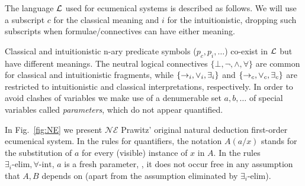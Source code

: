 
The language ${\mathcal L}$ used for ecumenical systems is described as follows. We will use a subscript $c$ for the classical meaning and $i$ for the intuitionistic, dropping such subscripts when formulae/connectives can have either meaning. 

Classical and intuitionistic  n-ary predicate symbols ($p_{c}, p_{i},\ldots$) co-exist in ${\mathcal L}$ but have different meanings. 
The neutral logical connectives $\{\bot,\neg,\wedge,\forall\}$ are common for classical and intuitionistic fragments, while $\{\rightarrow_i,\vee_i,\exists_{i}\}$ and $\{\rightarrow_c,\vee_c,\exists_{c}\}$ are restricted to intuitionistic and classical interpretations, respectively. In order to avoid clashes of variables we make use of a denumerable set $a, b,\ldots$ of special variables called {\em parameters}, which do not appear quantified. 


In Fig.~\ref{fig:NE} we present $\mathcal{NE}$ Prawitz' original natural deduction first-order ecumenical system. In the rules for quantifiers, the notation $A(a/x)$  stands for the substitution of $a$ for every (visible) instance of $x$ in $A$. In the rules $\exists_i\mbox{-elim},\forall\mbox{-int}$, $a$ is a fresh parameter, \ie, it does not occur free in any assumption that $A,B$ depends on (apart from the assumption eliminated by $\exists_{i}$-elim).

